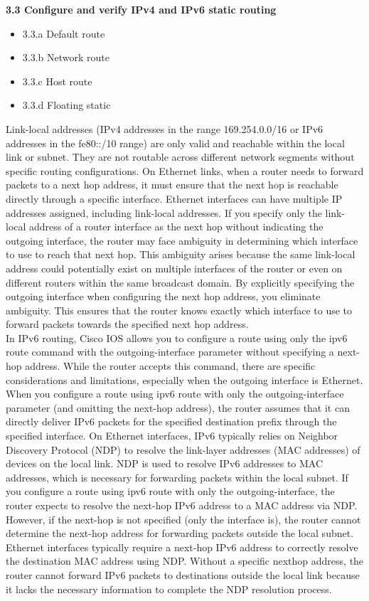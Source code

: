 \documentclass{article}
\begin{document}
\noindent\textbf{3.3 Configure and verify IPv4 and IPv6 static routing}
\begin{itemize}
\item 3.3.a Default route
\item 3.3.b Network route
\item 3.3.c Host route
\item 3.3.d Floating static
\end{itemize}
	
	Link-local addresses (IPv4 addresses in the range 169.254.0.0/16 or IPv6 addresses in the fe80::/10 range) are only valid and reachable within the local link or subnet. They are not routable across different network segments without specific routing configurations. On Ethernet links, when a router needs to forward packets to a next hop address, it must ensure that the next hop is reachable directly through a specific interface. Ethernet interfaces can have multiple IP addresses assigned, including link-local addresses. If you specify only the link-local address of a router interface as the next hop without indicating the outgoing interface, the router may face ambiguity in determining which interface to use to reach that next hop. This ambiguity arises because the same link-local address could potentially exist on multiple interfaces of the router or even on different routers within the same broadcast domain. By explicitly specifying the outgoing interface when configuring the next hop address, you eliminate ambiguity. This ensures that the router knows exactly which interface to use to forward packets towards the specified next hop address.\\
	
	In IPv6 routing, Cisco IOS allows you to configure a route using only the ipv6 route command with the outgoing-interface parameter without specifying a next-hop address. While the router accepts this command, there are specific considerations and limitations, especially when the outgoing interface is Ethernet. When you configure a route using ipv6 route with only the outgoing-interface parameter (and omitting the next-hop address), the router assumes that it can directly deliver IPv6 packets for the specified destination prefix through the specified interface. On Ethernet interfaces, IPv6 typically relies on Neighbor Discovery Protocol (NDP) to resolve the link-layer addresses (MAC addresses) of devices on the local link. NDP is used to resolve IPv6 addresses to MAC addresses, which is necessary for forwarding packets within the local subnet. If you configure a route using ipv6 route with only the outgoing-interface, the router expects to resolve the next-hop IPv6 address to a MAC address via NDP. However, if the next-hop is not specified (only the interface is), the router cannot determine the next-hop address for forwarding packets outside the local subnet. Ethernet interfaces typically require a next-hop IPv6 address to correctly resolve the destination MAC address using NDP. Without a specific next\-hop address, the router cannot forward IPv6 packets to destinations outside the local link because it lacks the necessary information to complete the NDP resolution process.\\
	
\end{document}
